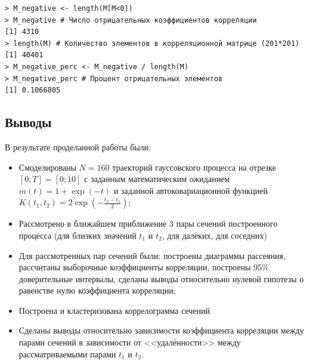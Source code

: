 \documentclass[14pt,a4paper]{scrartcl}
\begin{document}
\begin{verbatim}
> M_negative <- length(M[M<0])
> M_negative # Число отрицательных коэффициентов корреляции
[1] 4310
> length(M) # Количество элементов в корреляционной матрице (201*201)
[1] 40401
> M_negative_perc <- M_negative / length(M)
> M_negative_perc # Процент отрицательных элементов
[1] 0.1066805
\end{verbatim}

\pagebreak
\subsection*{Выводы}
В результате проделанной работы были:
\begin{itemize}
	\item Смоделированы $N=160$ траекторий гауссовского процесса на отрезке $[0;T] = [0;10]$ с заданным математическим ожиданием ${m(t) = 1 + \exp(-t)}$ и заданной автоковариационной функцией $K(t_1,t_2) = 2\exp(-\frac{t_2-t_1}{2})$;
	\item Рассмотрено в ближайшем приближение 3 пары сечений построенного процесса (для близких значений $t_1$ и $t_2$, для далёких, для соседних)
	\item Для рассмотренных пар сечений были:
		\subitem построены диаграммы рассеяния,
		\subitem рассчитаны выборочные коэффициенты корреляции,
		\subitem построены 95\% доверительные интервалы,
		\subitem сделаны выводы относительно нулевой гипотезы о равенстве нулю коэффициента корреляции;
	\item Построена и кластеризована коррелограмма сечений
	\item Сделаны выводы относительно зависимости коэффициента корреляции между парами сечений в зависимости от <<удалённости>> между рассматриваемыми парами $t_1$ и $t_2$.
\end{itemize}
\end{document}
